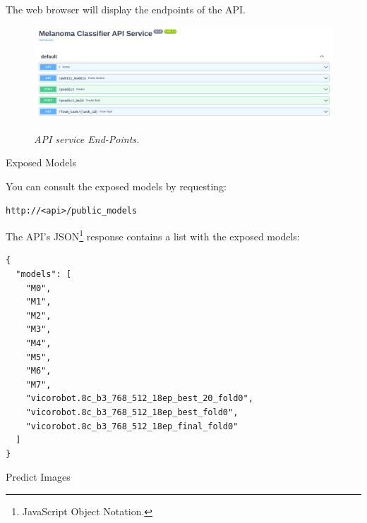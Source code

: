 \documentclass[dvipsnames,mathserif]{beamer}
\begin{document}
{\begin{frame}[fragile]
      The web browser will display the endpoints of the API.

      \begin{figure}[H]
        \centering
        \begin{adjustbox}{width=0.85\textwidth, trim={0cm 0cm 0.1cm 0cm}, clip}
          \includegraphics[width=\textwidth]{images/api-endpoints.png}
        \end{adjustbox}
        \caption[API service End-Points]{\textit{API service End-Points. }}
        {\label{fig:api-endpoints}}
      \end{figure}
    \end{frame}



    \begin{frame}[fragile]
      \large Exposed Models

      \vspace{0.25cm}
      \footnotesize
      You can consult the exposed models by requesting:

      \vspace{0.1cm}

      \begin{Verbatim}[fontsize=\tiny]
http://<api>/public_models
      \end{Verbatim}

      The API's JSON\footnote{JavaScript Object Notation.} response contains
      a list with the exposed models:

      \vspace{0.1cm}

      \begin{Verbatim}[fontsize=\tiny]
{
  "models": [
    "M0",
    "M1",
    "M2",
    "M3",
    "M4",
    "M5",
    "M6",
    "M7",
    "vicorobot.8c_b3_768_512_18ep_best_20_fold0",
    "vicorobot.8c_b3_768_512_18ep_best_fold0",
    "vicorobot.8c_b3_768_512_18ep_final_fold0"
  ]
}
      \end{Verbatim}

    \end{frame}


    \begin{frame}[fragile]
      \large Predict Images


\end{frame}}
\end{document}
